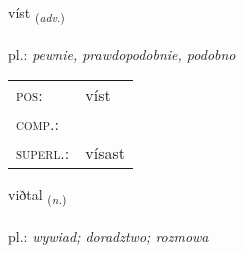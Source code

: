 \documentclass[frontgrid, backgrid]{flacards}\usepackage[]{graphicx}\usepackage[]{xcolor}
\begin{document}
\renewcommand{\flhead}{\vskip5pt \fboxsep=0pt {\small\bfseries\footnotesize Atviksorð | przysłówek}}
\renewcommand{\fcfoot}{\vskip5pt \fboxsep=0pt \hspace{2pt}{\small\bfseries\footnotesize 1K}}

\renewcommand{\blhead}{\vskip5pt {\small\bfseries\footnotesize Atviksorð | przysłówek }}
\renewcommand{\bcfoot}{\vskip5pt \hspace{2pt}{\small\bfseries\footnotesize 1K}}


{víst \small{\textsubscript{(\textit{adv.})}} \\[1ex] %
\textphonetic{[vist]} \\
pl.: \emph{pewnie, prawdopodobnie, podobno} \\  [2ex]
\renewcommand*{\arraystretch}{0.8}
\begin{tabular}{ll}
\textsc{pos}: & víst \\ 
\textsc{comp.}: &  \\ 
\textsc{superl.}: & vísast \\
\end{tabular}
}

\renewcommand{\flhead}{\vskip5pt \fboxsep=0pt {\small\bfseries\footnotesize Nafnorð | rzeczownik}}
\renewcommand{\fcfoot}{\vskip5pt \fboxsep=0pt \hspace{2pt}{\small\bfseries\footnotesize 1K}}

\renewcommand{\blhead}{\vskip5pt {\small\bfseries\footnotesize Nafnorð | rzeczownik }}
\renewcommand{\bcfoot}{\vskip5pt \hspace{2pt}{\small\bfseries\footnotesize 1K}}


{viðtal \small{\textsubscript{(\textit{n.})}} \\[1ex] %
\textphonetic{[vɪðtʰal]} \\
pl.: \emph{wywiad; doradztwo; rozmowa} \\  [2ex]
\renewcommand*{\arraystretch}{0.8}
}
\end{document}
